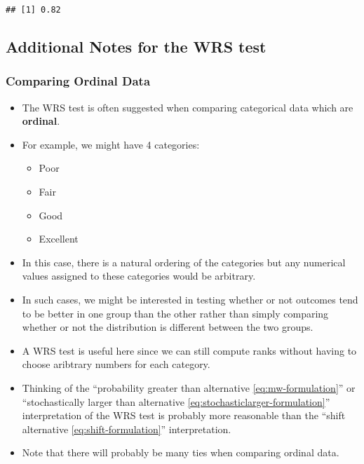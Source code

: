 \documentclass[]{book}
\providecommand{\tightlist}{%
  \setlength{\itemsep}{0pt}\setlength{\parskip}{0pt}}
\begin{document}
\begin{verbatim}
## [1] 0.82
\end{verbatim}

\hypertarget{additional-notes-for-the-wrs-test}{%
\subsection{Additional Notes for the WRS test}\label{additional-notes-for-the-wrs-test}}

\hypertarget{comparing-ordinal-data}{%
\subsubsection{Comparing Ordinal Data}\label{comparing-ordinal-data}}

\begin{itemize}
\item
  The WRS test is often suggested when comparing categorical data which are \textbf{ordinal}.
\item
  For example, we might have 4 categories:

  \begin{itemize}
  \tightlist
  \item
    Poor
  \item
    Fair
  \item
    Good
  \item
    Excellent
  \end{itemize}
\item
  In this case, there is a natural ordering of the categories
  but any numerical values assigned to these categories would be arbitrary.
\item
  In such cases, we might be interested in testing whether or not outcomes tend to be
  better in one group than the other rather than simply comparing whether or not
  the distribution is different between the two groups.
\item
  A WRS test is useful here since we can still compute ranks without having to
  choose aribtrary numbers for each category.
\item
  Thinking of the ``probability greater than alternative \eqref{eq:mw-formulation}''
  or ``stochastically larger than alternative \eqref{eq:stochasticlarger-formulation}'' interpretation
  of the WRS test is probably more reasonable than the ``shift alternative \eqref{eq:shift-formulation}'' interpretation.
\item
  Note that there will probably be many ties when comparing ordinal data.
\end{itemize}
\end{document}
